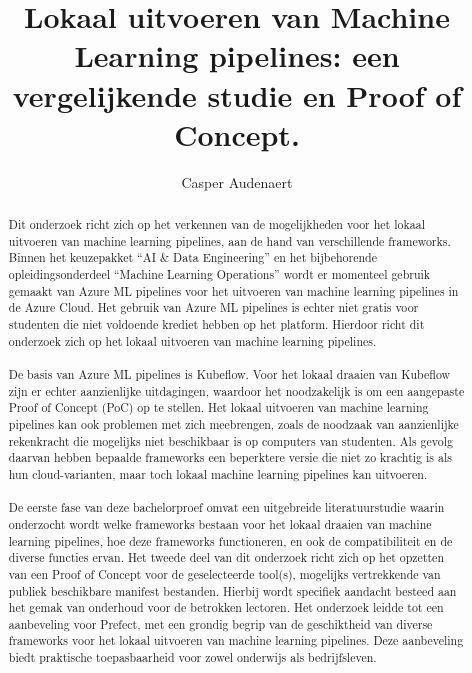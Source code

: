 \documentclass[a0,portrait]{hogent-poster}
\title{Lokaal uitvoeren van Machine Learning pipelines: een vergelijkende studie en Proof of Concept.}
\author{Casper Audenaert}
\begin{document}
\maketitle

\begin{abstract}
  Dit onderzoek richt zich op het verkennen van de mogelijkheden voor het lokaal uitvoeren van machine learning pipelines, aan de hand van verschillende frameworks.
  Binnen het keuzepakket ``AI \& Data Engineering'' en het bijbehorende opleidingsonderdeel ``Machine Learning Operations'' wordt er momenteel gebruik gemaakt van Azure ML pipelines voor het uitvoeren van machine learning pipelines in de Azure Cloud.
  Het gebruik van Azure ML pipelines is echter niet gratis voor studenten die niet voldoende krediet hebben op het platform. Hierdoor richt dit onderzoek zich op het lokaal uitvoeren van machine learning pipelines.\\\\
  De basis van Azure ML pipelines is Kubeflow. Voor het lokaal draaien van Kubeflow zijn er echter aanzienlijke uitdagingen, waardoor het noodzakelijk is om een aangepaste Proof of Concept (PoC) op te stellen.
  Het lokaal uitvoeren van machine learning pipelines kan ook problemen met zich meebrengen, zoals de noodzaak van aanzienlijke rekenkracht die mogelijks niet beschikbaar is op computers van studenten. Als gevolg daarvan hebben bepaalde frameworks een beperktere versie die niet zo krachtig is als hun cloud-varianten, maar toch lokaal machine learning pipelines kan uitvoeren.\\\\
  De eerste fase van deze bachelorproef omvat een uitgebreide literatuurstudie waarin onderzocht wordt welke frameworks bestaan voor het lokaal draaien van machine learning pipelines, hoe deze frameworks functioneren, en ook de compatibiliteit en de diverse functies ervan.
  Het tweede deel van dit onderzoek richt zich op het opzetten van een Proof of Concept voor de geselecteerde tool(s), mogelijks vertrekkende van publiek beschikbare manifest bestanden. Hierbij wordt specifiek aandacht besteed aan het gemak van onderhoud voor de betrokken lectoren.
  Het onderzoek leidde tot een aanbeveling voor Prefect, met een grondig begrip van de geschiktheid van diverse frameworks voor het lokaal uitvoeren van machine learning pipelines. Deze aanbeveling biedt praktische toepasbaarheid voor zowel onderwijs als bedrijfsleven.
\end{abstract}
\end{document}

